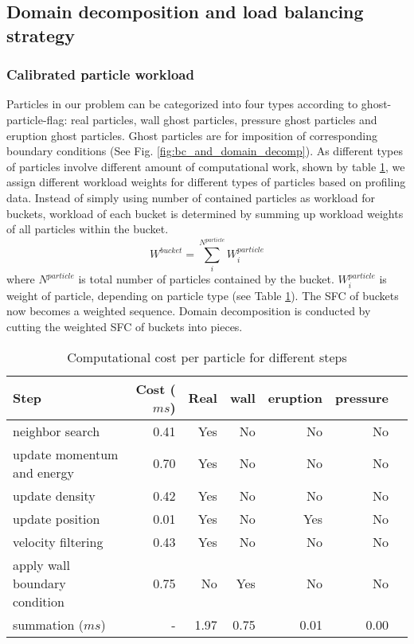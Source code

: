 \subsection{Domain decomposition and load balancing strategy}
\label{sect:load_balance}

\subsubsection{Calibrated particle workload} \label{sec:Weighted_work_load}
Particles in our problem can be categorized into four types according to ghost-particle-flag: real particles, wall ghost particles, pressure ghost particles and eruption ghost particles. Ghost particles are for imposition of corresponding boundary conditions (See Fig. \ref{fig:bc_and_domain_decomp}). As different types of particles involve different amount of computational work, shown by table \ref{tab:Computational_cost_steps}, we assign different workload weights for different types of particles based on profiling data. Instead of simply using number of contained particles as workload for buckets, workload of each bucket is determined by summing up workload weights of all particles within the bucket.
\begin{equation}
W^{bucket} = \sum_i^{N^{particle}} W_i^{particle}
\label{eq:work-load-bucket}
\end{equation}
where $N^{particle}$ is total number of particles contained by the bucket. $W_i^{particle}$ is weight of particle, depending on particle type (see Table \ref{tab:Computational_cost_steps}).
The SFC of buckets now becomes a weighted sequence. Domain decomposition is conducted by cutting the weighted SFC of buckets into pieces.

\begin{table}
\centering
\caption{Computational cost per particle for different steps}	
\label{tab:Computational_cost_steps}
	  \begin{tabular}{lrrrrrr}
	    \hline
	    Step & Cost ($ms$) & Real & wall & eruption & pressure\\
	    \hline
	    neighbor search & 0.41 & Yes & No & No & No \\
	    update momentum and energy & 0.70 & Yes & No & No & No\\
	    update density & 0.42 & Yes & No & No & No \\
	    update position & 0.01 & Yes & No & Yes &  No\\
	    velocity filtering& 0.43 & Yes & No & No & No\\
	    apply wall boundary condition     & 0.75 & No & Yes & No & No\\
	    summation ($ms$) & - & 1.97 & 0.75 & 0.01 & 0.00\\
	    \hline
	  \end{tabular}
\end{table}

